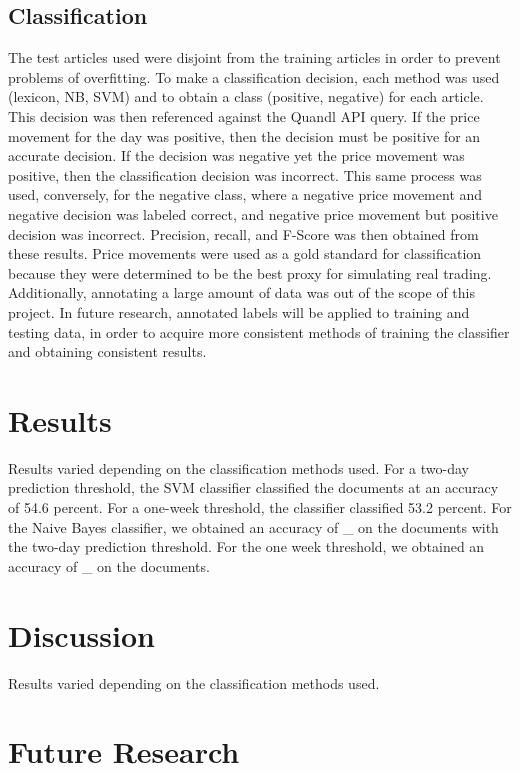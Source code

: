 \documentclass{article}
\begin{document}
    \subsection{Classification}
    
    The test articles used were disjoint from the training articles in order to prevent problems of overfitting. To make a classification decision, each method was used (lexicon, NB, SVM) and to obtain a class (positive, negative) for each article. This decision was then referenced against the Quandl API query. If the price movement for the day was positive, then the decision must be positive for an accurate decision. If the decision was negative yet the price movement was positive, then the classification decision was incorrect. This same process was used, conversely, for the negative class, where a negative price movement and negative decision was labeled correct, and negative price movement but positive decision was incorrect. Precision, recall, and F-Score was then obtained from these results. Price movements were used as a gold standard for classification because they were determined to be the best proxy for simulating real trading. Additionally, annotating a large amount of data was out of the scope of this project. In future research, annotated labels will be applied to training and testing data, in order to acquire more consistent methods of training the classifier and obtaining consistent results. 
    
\section{Results}

    Results varied depending on the classification methods used. For a two-day prediction threshold, the SVM classifier classified the documents at an accuracy of 54.6 percent. For a one-week threshold, the classifier classified 53.2 percent. For the Naive Bayes classifier, we obtained an accuracy of _ on the documents with the two-day prediction threshold. For the one week threshold, we obtained an accuracy of _ on the documents. 
    


\section{Discussion}

    Results varied depending on the classification methods used. 

\section{Future Research}
    
\end{document}
